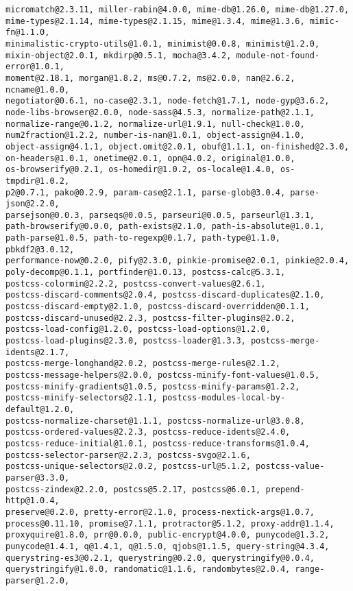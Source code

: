 \documentclass[a4paper]{article}
\begin{document}
\begin{verbatim}
micromatch@2.3.11, miller-rabin@4.0.0, mime-db@1.26.0, mime-db@1.27.0,
mime-types@2.1.14, mime-types@2.1.15, mime@1.3.4, mime@1.3.6, mimic-fn@1.1.0,
minimalistic-crypto-utils@1.0.1, minimist@0.0.8, minimist@1.2.0,
mixin-object@2.0.1, mkdirp@0.5.1, mocha@3.4.2, module-not-found-error@1.0.1,
moment@2.18.1, morgan@1.8.2, ms@0.7.2, ms@2.0.0, nan@2.6.2, ncname@1.0.0,
negotiator@0.6.1, no-case@2.3.1, node-fetch@1.7.1, node-gyp@3.6.2,
node-libs-browser@2.0.0, node-sass@4.5.3, normalize-path@2.1.1,
normalize-range@0.1.2, normalize-url@1.9.1, null-check@1.0.0,
num2fraction@1.2.2, number-is-nan@1.0.1, object-assign@4.1.0,
object-assign@4.1.1, object.omit@2.0.1, obuf@1.1.1, on-finished@2.3.0,
on-headers@1.0.1, onetime@2.0.1, opn@4.0.2, original@1.0.0,
os-browserify@0.2.1, os-homedir@1.0.2, os-locale@1.4.0, os-tmpdir@1.0.2,
p2@0.7.1, pako@0.2.9, param-case@2.1.1, parse-glob@3.0.4, parse-json@2.2.0,
parsejson@0.0.3, parseqs@0.0.5, parseuri@0.0.5, parseurl@1.3.1,
path-browserify@0.0.0, path-exists@2.1.0, path-is-absolute@1.0.1,
path-parse@1.0.5, path-to-regexp@0.1.7, path-type@1.1.0, pbkdf2@3.0.12,
performance-now@0.2.0, pify@2.3.0, pinkie-promise@2.0.1, pinkie@2.0.4,
poly-decomp@0.1.1, portfinder@1.0.13, postcss-calc@5.3.1,
postcss-colormin@2.2.2, postcss-convert-values@2.6.1,
postcss-discard-comments@2.0.4, postcss-discard-duplicates@2.1.0,
postcss-discard-empty@2.1.0, postcss-discard-overridden@0.1.1,
postcss-discard-unused@2.2.3, postcss-filter-plugins@2.0.2,
postcss-load-config@1.2.0, postcss-load-options@1.2.0,
postcss-load-plugins@2.3.0, postcss-loader@1.3.3, postcss-merge-idents@2.1.7,
postcss-merge-longhand@2.0.2, postcss-merge-rules@2.1.2,
postcss-message-helpers@2.0.0, postcss-minify-font-values@1.0.5,
postcss-minify-gradients@1.0.5, postcss-minify-params@1.2.2,
postcss-minify-selectors@2.1.1, postcss-modules-local-by-default@1.2.0,
postcss-normalize-charset@1.1.1, postcss-normalize-url@3.0.8,
postcss-ordered-values@2.2.3, postcss-reduce-idents@2.4.0,
postcss-reduce-initial@1.0.1, postcss-reduce-transforms@1.0.4,
postcss-selector-parser@2.2.3, postcss-svgo@2.1.6,
postcss-unique-selectors@2.0.2, postcss-url@5.1.2, postcss-value-parser@3.3.0,
postcss-zindex@2.2.0, postcss@5.2.17, postcss@6.0.1, prepend-http@1.0.4,
preserve@0.2.0, pretty-error@2.1.0, process-nextick-args@1.0.7,
process@0.11.10, promise@7.1.1, protractor@5.1.2, proxy-addr@1.1.4,
proxyquire@1.8.0, prr@0.0.0, public-encrypt@4.0.0, punycode@1.3.2,
punycode@1.4.1, q@1.4.1, q@1.5.0, qjobs@1.1.5, query-string@4.3.4,
querystring-es3@0.2.1, querystring@0.2.0, querystringify@0.0.4,
querystringify@1.0.0, randomatic@1.1.6, randombytes@2.0.4, range-parser@1.2.0,

\end{verbatim}
\end{document}
